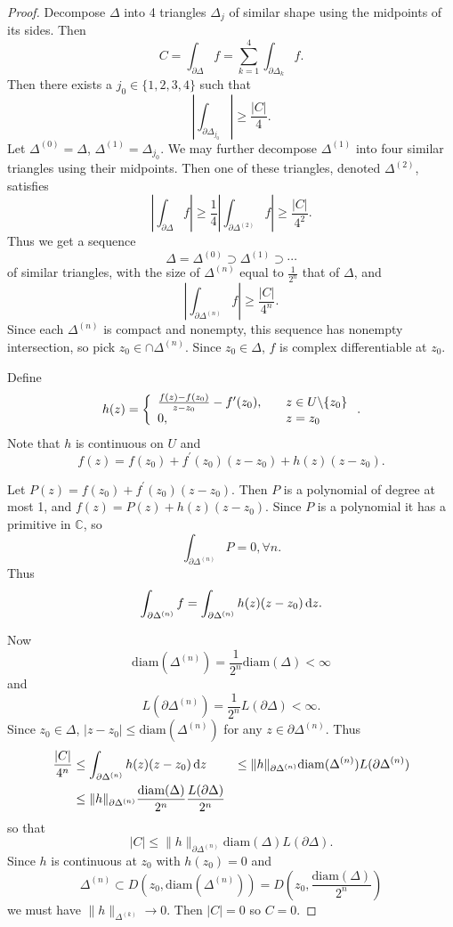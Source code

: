 \begin{proof}
Decompose $\Delta$ into 4 triangles $\Delta_j$ of similar shape using
the midpoints of its sides. Then
$$
C = \int_{\partial \Delta} f = \sum_{k=1}^4 \int_{\partial \Delta_k} f.
$$
Then there exists a $j_0 \in \{1,2,3,4\}$ such that
$$
\left|\int_{\partial \Delta_{j_0}}\right| \geq \frac{|C|}{4}.
$$
Let $\Delta^{(0)} = \Delta$, $\Delta^{(1)} = \Delta_{j_0}$. We may
further decompose $\Delta^{(1)}$ into four similar triangles using
their midpoints. Then one of these triangles, denoted $\Delta^{(2)}$,
satisfies
$$
     \left| \int_{\partial \Delta} f \right|
\geq \frac{1}{4}\left|\int_{\partial \Delta^{(2)}} f \right|
\geq \frac{|C|}{4^2}.
$$
Thus we get a sequence
$$
\Delta = \Delta^{(0)} \supset \Delta^{(1)} \supset \cdots
$$
of similar triangles, with the size of $\Delta^{(n)}$ equal to
$\frac{1}{2^n}$ that of $\Delta$, and
$$
\left| \int_{\partial \Delta^{(n)}} f \right| \geq \frac{|C|}{4^n}.
$$
Since each $\Delta^{(n)}$ is compact and nonempty, this sequence
has nonempty intersection, so pick $z_0 \in \cap \Delta^{(n)}$.
Since $z_0 \in \Delta$, $f$ is complex differentiable at $z_0$.

Define
$$
h(z)
=
\left\{\begin{array}{l l}
  \frac{f(z) - f(z_0)}{z - z_0} - f^\prime(z_0), &
  \quad z \in U \backslash \{ z_0 \} \\
  0, & \quad z = z_0
\end{array}\right..
$$
Note that $h$ is continuous on $U$ and
$$
f(z) = f(z_0) + f^\prime(z_0)(z-z_0) + h(z)(z - z_0).
$$

Let $P(z) = f(z_0) + f^\prime(z_0) (z - z_0)$. Then
$P$ is a polynomial of degree at most 1, and
$f(z) = P(z) + h(z)(z - z_0)$. Since $P$ is a polynomial
it has a primitive in $\mathbb{C}$, so
$$
\int_{\partial \Delta^{(n)}} P = 0, \forall n.
$$
Thus
$$
\int_{\partial \Delta^{(n)}} f
= \int_{\partial \Delta^{(n)}} h(z) (z - z_0) \mathop{}\!\mathrm{d} z.
$$

Now
$$
  \mathrm{diam}(\Delta^{(n)})
= \frac{1}{2^n} \mathrm{diam}(\Delta)
< \infty
$$
and
$$
  L(\partial \Delta^{(n)})
= \frac{1}{2^n} L(\partial \Delta)
< \infty.
$$
Since $z_0 \in \Delta$,
$|z - z_0| \leq \mathrm{diam}(\Delta^{(n)})$
for any $z \in \partial \Delta^{(n)}$. Thus
\begin{align*}
\frac{|C|}{4^n}
&\leq \int_{\partial \Delta^{(n)}} h(z) (z-z_0) \mathop{}\!\mathrm{d} z
&\leq \|h\|_{\partial \Delta^{(n)}}
      \mathrm{diam}(\Delta^{(n)})
      L(\partial\Delta^{(n)}) \\
&\leq \|h\|_{\partial \Delta^{(n)}}
      \frac{\mathrm{diam}(\Delta)}{2^n}
      \frac{L(\partial \Delta)}{2^n}
\end{align*}
so that
$$
|C| \leq \|h\|_{\partial \Delta^{(n)}}
         \mathrm{diam}(\Delta)
         L(\partial \Delta).
$$
Since $h$ is continuous at $z_0$ with $h(z_0) = 0$
and
$$
        \Delta^{(n)}
\subset D\left(z_0, \mathrm{diam}(\Delta^{(n)})\right)
=       D\left(z_0, \frac{\mathrm{diam}(\Delta)}{2^n}\right)
$$
we must have $\| h \|_{\Delta^{(k)}} \to 0$. Then $|C| = 0$ so $C = 0$.
\end{proof}

